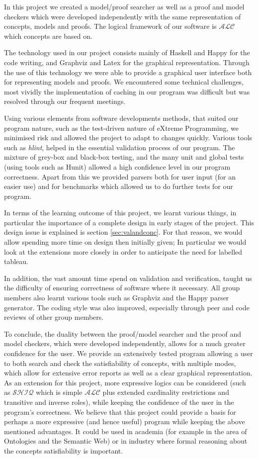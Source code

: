 In this project we created a model/proof searcher as well as a proof and model checkers which were developed independently with the same representation of concepts, models and proofs. The logical framework of our software is $\mathcal{ALC}$ which concepts are based on. 

The technology used in our project consists mainly of Haskell and Happy for the code writing, and Graphviz and Latex for the graphical representation. Through the use of this technology we were able to provide a graphical user interface both for representing models and proofs. We encountered some technical challenges, most vividly the implementation of caching in our program was difficult but was resolved through our frequent meetings.

Using various elements from software developments methods, that suited our program nature, such as the test-driven nature of eXtreme Programming, we minimised risk and allowed the project to adapt to changes quickly. Various tools such as \emph{hlint}, helped in the essential validation process of our program. The mixture of grey-box and black-box testing, and the many unit and global tests (using tools such as Hunit) allowed a high confidence level in our program correctness. 
Apart from this we provided parsers both for user input (for an easier use) and for benchmarks which allowed us to do further tests for our program.

In terms of the learning outcome of this project, we learnt various things, in particular the importance of a complete design in early stages of the project. This design issue is explained is section \ref{sec:valandconc}. For that reason, we would allow spending more time on design then initially given; In particular we would look at the extensions more closely in order to anticipate the need for labelled tableau.

In addition, the vast amount time spend on validation and verification, taught us the difficulty of ensuring correctness of software where it necessary. All group members also learnt various tools such as Graphviz and the Happy parser generator. The coding style was also improved, especially through peer and code reviews of other group members. 

To conclude, the duality between the proof/model searcher and the proof and model checkers, which were developed independently, allows for a much greater confidence for the user. We provide an extensively tested program allowing a user to both search and check the satisfiability of concepts, with multiple modes, which allow for extensive error reports as well as a clear graphical representation. As an extension for this project, more expressive logics can be considered (such as $\mathcal{SHIQ}$ which is simple $\mathcal{ALC}$ plus extended cardinality restrictions and transitive and inverse roles), while keeping the confidence of the user in the program's correctness. We believe that this project could provide a basis for perhaps a more expressive (and hence useful) program while keeping the above mentioned advantages. It could be used in academia (for example in the area of Ontologies and the Semantic Web) or in industry where formal reasoning about the concepts satisfiability is important. 
